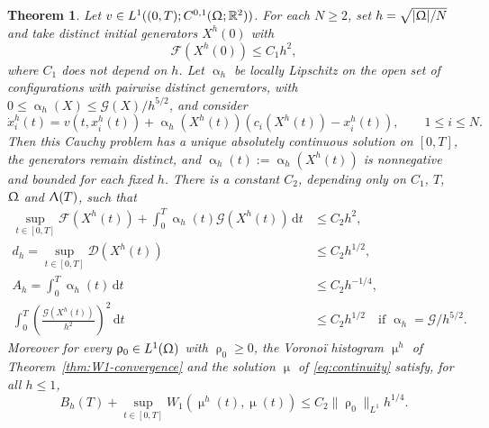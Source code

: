 \documentclass[letterpaper,11pt,twoside]{article}
\numberwithin{figure}{section}
\numberwithin{table}{section}
\theoremstyle{cpamplain}
\newtheorem{theorem}{Theorem}[section]
\theoremstyle{cpamdefinition}
\newcommand{\R}{\mathbb{R}}
\newcommand{\diff}{\mathrm{d}}
\let\alpha\upalpha
\let\mu\upmu
\let\rho\uprho
\let\Lambda\Uplambda
\let\Omega\Upomega
\renewcommand{\leq}{\leqslant}
\renewcommand{\le}{\leqslant}
\renewcommand{\ge}{\geqslant}
\numberwithin{equation}{section}
\begin{document}
\begin{theorem}\label{thm:adaptive-energy-convergence}
Let $v\in L^1((0,T);C^{0,1}(\Omega;\R^2))$.
For each $N\ge2$, set $h=\sqrt{|\Omega|/N}$ and take distinct initial generators $X^h(0)$ with
\begin{equation}\label{eq:adaptive-initial-energy}
\mathscr F(X^h(0))\le C_1h^2,
\end{equation}
where $C_1$ does not depend on $h$.
Let $\alpha_h$ be locally Lipschitz on the open set of configurations with pairwise distinct generators, with
$0\leq \alpha_h(X)\leq \mathscr G(X)/h^{5/2}$,
and consider
\begin{equation}\label{eq:adaptive-energy-feedback}
\dot x_i^h(t)=v(t,x_i^h(t))+\alpha_h(X^h(t))\left(c_i(X^h(t))-x_i^h(t)\right),
\qquad 1\le i\le N.
\end{equation}
Then this Cauchy problem has a unique absolutely continuous solution on $[0,T]$, the generators remain distinct, and $\alpha_h(t):=\alpha_h(X^h(t))$ is nonnegative and bounded for each fixed $h$.
There is a constant $C_2$, depending only on $C_1$, $T$, $\Omega$ and $\Lambda(T)$, such that
\begin{align}
\sup_{t\in[0,T]}\mathscr F(X^h(t))
+\int_0^T\alpha_h(t)\mathscr G(X^h(t))\,\diff t
&\le C_2 h^2,\label{eq:adaptive-energy-dissipation}\\
d_h=\sup_{t\in[0,T]}\mathscr D(X^h(t))
&\le C_2 h^{1/2},\label{eq:adaptive-diameter}\\
A_h=\int_0^T\alpha_h(t)\,\diff t
&\le C_2 h^{-1/4},\label{eq:adaptive-alpha-budget}\\
\int_0^T\left(\frac{\mathscr G(X^h(t))}{h^2}\right)^2\,\diff t
&\le C_2 h^{1/2}\quad\text{if }\alpha_h=\mathscr G/h^{5/2}.\label{eq:adaptive-centroid-error}
\end{align}
Moreover for every $\rho_0\in L^1(\Omega)$ with $\rho_0\ge0$, the Vorono\"i histogram $\mu^h$ of Theorem~\ref{thm:W1-convergence} and the solution $\mu$ of \eqref{eq:continuity} satisfy, for all $h\le1$,
\begin{equation}\label{eq:adaptive-transport-convergence}
B_h(T)+\sup_{t\in[0,T]}W_1(\mu^h(t),\mu(t))
\le C_2\|\rho_0\|_{L^1}h^{1/4}.
\end{equation}
\end{theorem}

\end{document}
